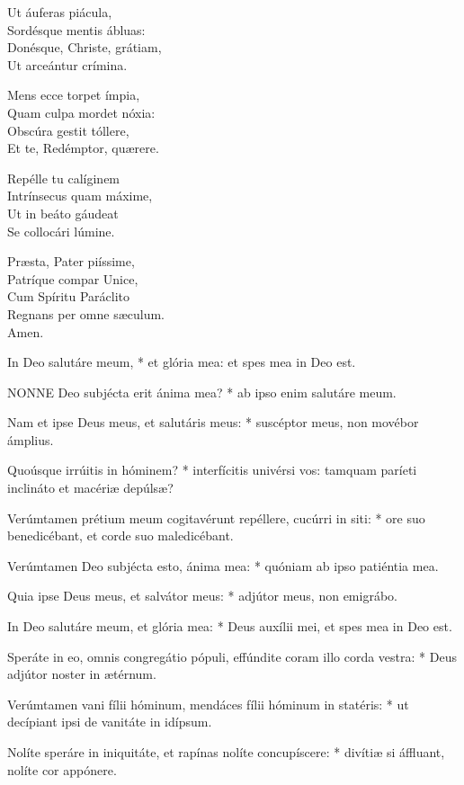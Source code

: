 Ut áuferas piácula,\\
Sordésque mentis ábluas:\\
Donésque, Christe, grátiam,\\
Ut arceántur crímina.

Mens ecce torpet ímpia,\\
Quam culpa mordet nóxia:\\
Obscúra gestit tóllere,\\
Et te, Redémptor, quærere.

Repélle tu calíginem\\
Intrínsecus quam máxime,\\
Ut in beáto gáudeat\\
Se collocári lúmine.

Præsta, Pater piíssime,\\
Patríque compar Unice,\\
Cum Spíritu Paráclito\\
Regnans per omne sæculum.\\
Amen.


 In Deo salutáre meum, * et glória mea: et spes mea in Deo est.


\lettrine[lines=2]{N}{ONNE} Deo subjécta erit ánima mea? * ab ipso enim salutáre meum.

Nam et ipse Deus meus, et salutáris meus: * suscéptor meus, non movébor ámplius.

Quoúsque irrúitis in hóminem? * interfícitis univérsi vos: tamquam paríeti inclináto et macériæ depúlsæ?

Verúmtamen prétium meum cogitavérunt repéllere, cucúrri in siti: * ore suo benedicébant, et corde suo maledicébant.

Verúmtamen Deo subjécta esto, ánima mea: * quóniam ab ipso patiéntia mea.

Quia ipse Deus meus, et salvátor meus: * adjútor meus, non emigrábo.

In Deo salutáre meum, et glória mea: * Deus auxílii mei, et spes mea in Deo est.

Speráte in eo, omnis congregátio pópuli, effúndite coram illo corda vestra: * Deus adjútor noster in ætérnum.

Verúmtamen vani fílii hóminum, mendáces fílii hóminum in statéris: * ut decípiant ipsi de vanitáte in idípsum.

Nolíte speráre in iniquitáte, et rapínas nolíte concupíscere: * divítiæ si áffluant, nolíte cor appónere.

